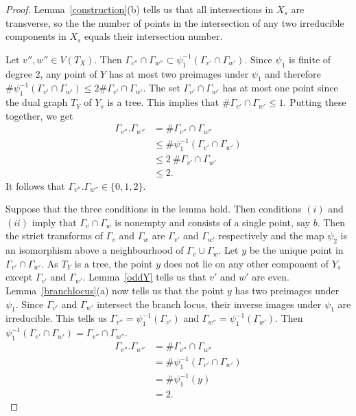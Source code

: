 \begin{proof}
Lemma~\ref{construction}(b) tells us that all intersections in $X_s$ are transverse, so the the number of points in the intersection of any two irreducible components in $X_s$ equals their intersection number.

Let $v'',w'' \in V(T_X)$. Then $\Gamma_{v''} \cap \Gamma_{w''} \subset \psi_1^{-1}(\Gamma_{v'} \cap \Gamma_{w'})$. Since $\psi_1$ is finite of degree $2$, any point of $Y$ has at most two preimages under $\psi_1$ and therefore $\# \psi_1^{-1}(\Gamma_{v'} \cap \Gamma_{w'}) \leq 2 \# \Gamma_{v'} \cap \Gamma_{w'}$. The set $\Gamma_{v'} \cap \Gamma_{w'}$ has at most one point since the dual graph $T_Y$ of $Y_s$ is a tree. This implies that $\# \Gamma_{v'} \cap \Gamma_{w'} \leq 1$. Putting these together, we get
\begin{align*}
 \Gamma_{v''}.\Gamma_{w''} &= \# \Gamma_{v''} \cap \Gamma_{w''} \\
 &\leq \#\psi_1^{-1}(\Gamma_{v'} \cap \Gamma_{w'}) \\
 &\leq 2 \ \# \Gamma_{v'} \cap \Gamma_{w'} \\
 &\leq 2 . 
\end{align*} 
It follows that $\Gamma_{v''}.\Gamma_{w''} \in \{0,1,2\}$.

Suppose that the three conditions in the lemma hold. Then conditions $(i)$ and $(ii)$ imply that $\Gamma_v \cap \Gamma_w$ is nonempty and consists of a single point, say $b$. Then the strict transforms of $\Gamma_v$ and $\Gamma_w$ are $\Gamma_{v'}$ and $\Gamma_{w'}$ respectively and the map $\psi_2$ is an isomorphism above a neighbourhood of $\Gamma_{v} \cup \Gamma_{w}$. Let $y$ be the unique point in $\Gamma_{v'} \cap \Gamma_{w'}$. As $T_Y$ is a tree, the point $y$ does not lie on any other component of $Y_s$ except $\Gamma_{v'}$ and $\Gamma_{w'}$. Lemma~\ref{oddY} tells us that $v'$ and $w'$ are even. Lemma~\ref{branchlocus}(a) now tells us that the point $y$ has two preimages under $\psi_1$. Since $\Gamma_{v'}$ and $\Gamma_{w'}$ intersect the branch locus, their inverse images under $\psi_1$ are irreducible. This tells us $\Gamma_{v''} = \psi_1^{-1}(\Gamma_{v'})$ and $\Gamma_{w''} = \psi_1^{-1}(\Gamma_{w'})$. Then $\psi_1^{-1}(\Gamma_{v'} \cap \Gamma_{w'}) = \Gamma_{v''} \cap \Gamma_{w''}$. 
\begin{align*}
 \Gamma_{v''}.\Gamma_{w''} &= \# \Gamma_{v''} \cap \Gamma_{w''} \\
 &= \# \psi_1^{-1}(\Gamma_{v'} \cap \Gamma_{w'}) \\
 &= \# \psi_1^{-1}(y) \\
 &= 2.
\end{align*}
 

\end{proof}
